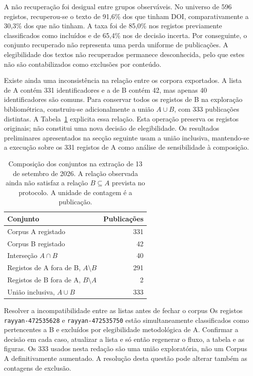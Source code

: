 A não recuperação foi desigual entre grupos observáveis. No universo
de 596 registos, recuperou-se o texto de 91,6\% dos que tinham DOI,
comparativamente a 30,3\% dos que não tinham. A taxa foi de 85,0\% nos
registos previamente classificados como incluídos e de 65,4\% nos de
decisão incerta. Por conseguinte, o conjunto recuperado não representa
uma perda uniforme de publicações. A elegibilidade dos textos não
recuperados permanece desconhecida, pelo que estes não são contabilizados
como exclusões por conteúdo.

Existe ainda uma inconsistência na relação entre os corpora exportados.
A lista de A contém 331 identificadores e a de B contém 42, mas apenas
40 identificadores são comuns. Para conservar todos os registos de B
na exploração bibliométrica, construiu-se adicionalmente a união
$A\cup B$, com 333 publicações distintas. A Tabela~\ref{tab:composicao-corpora}
explicita essa relação. Esta operação preserva os registos originais;
não constitui uma nova decisão de elegibilidade. Os resultados
preliminares apresentados na secção seguinte usam a união inclusiva,
mantendo-se a execução sobre os 331 registos de A como análise de
sensibilidade à composição.

\begin{table}[htbp]
  \centering
  \caption{Composição dos conjuntos na extração de 13 de setembro de 2026.
  A relação observada ainda não satisfaz a relação $B\subseteq A$
  prevista no protocolo. A unidade de contagem é a publicação.}
  \label{tab:composicao-corpora}
  \begin{tabular}{lr}
    \toprule
    Conjunto & Publicações \\
    \midrule
    Corpus A registado & 331 \\
    Corpus B registado & 42 \\
    Interseção $A\cap B$ & 40 \\
    Registos de A fora de B, $A\setminus B$ & 291 \\
    Registos de B fora de A, $B\setminus A$ & 2 \\
    União inclusiva, $A\cup B$ & 333 \\
    \bottomrule
  \end{tabular}
\end{table}

{Resolver a incompatibilidade entre as listas antes de fechar o corpus}
{Os registos \texttt{rayyan-472535628} e \texttt{rayyan-472535750}
estão simultaneamente classificados como pertencentes a B e excluídos
por elegibilidade metodológica de A. Confirmar a decisão em cada caso,
atualizar a lista e só então regenerar o fluxo, a tabela e as figuras.
Os 333 usados nesta redação são uma união exploratória, não um Corpus A
definitivamente aumentado. A resolução desta questão pode alterar
também as contagens de exclusão.}%


